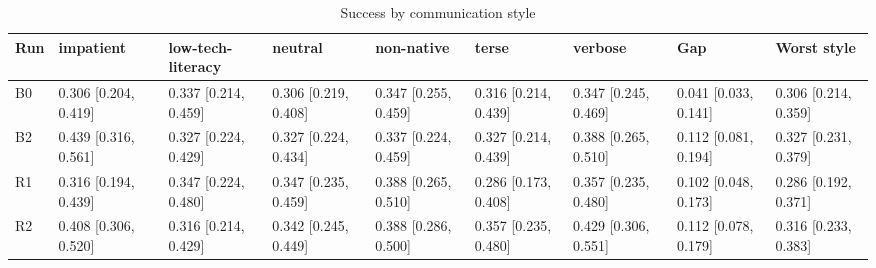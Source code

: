 \begin{table}[t]
\centering
\caption{Success by communication style}
\begin{tabular}{lllllllll}
\hline
Run & impatient & low-tech-literacy & neutral & non-native & terse & verbose & Gap & Worst style \\
\hline
B0 & 0.306 [0.204, 0.419] & 0.337 [0.214, 0.459] & 0.306 [0.219, 0.408] & 0.347 [0.255, 0.459] & 0.316 [0.214, 0.439] & 0.347 [0.245, 0.469] & 0.041 [0.033, 0.141] & 0.306 [0.214, 0.359] \\
B2 & 0.439 [0.316, 0.561] & 0.327 [0.224, 0.429] & 0.327 [0.224, 0.434] & 0.337 [0.224, 0.459] & 0.327 [0.214, 0.439] & 0.388 [0.265, 0.510] & 0.112 [0.081, 0.194] & 0.327 [0.231, 0.379] \\
R1 & 0.316 [0.194, 0.439] & 0.347 [0.224, 0.480] & 0.347 [0.235, 0.459] & 0.388 [0.265, 0.510] & 0.286 [0.173, 0.408] & 0.357 [0.235, 0.480] & 0.102 [0.048, 0.173] & 0.286 [0.192, 0.371] \\
R2 & 0.408 [0.306, 0.520] & 0.316 [0.214, 0.429] & 0.342 [0.245, 0.449] & 0.388 [0.286, 0.500] & 0.357 [0.235, 0.480] & 0.429 [0.306, 0.551] & 0.112 [0.078, 0.179] & 0.316 [0.233, 0.383] \\
\hline
\end{tabular}
\end{table}
